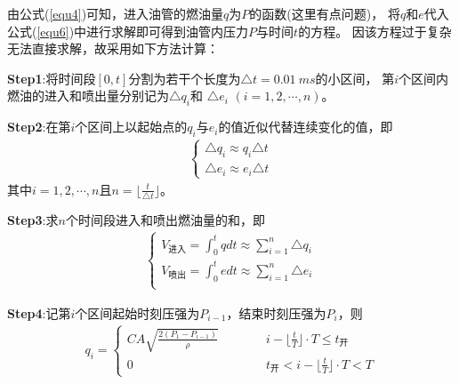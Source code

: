 \documentclass[withoutpreface,bwprint]{cumcmthesis} %
\begin{document}
    由公式(\ref{equ4})可知，进入油管的燃油量$q$为$P$的函数({\color{red}这里有点问题})，
    将$q$和$e$代入公式(\ref{equ6})中进行求解即可得到油管内压力$P$与时间$t$的方程。
    因该方程过于复杂无法直接求解，故采用如下方法计算：
    
    \textbf{Step1}:将时间段$[0,t]$分割为若干个长度为$\triangle t=0.01~ms$的小区间，
    第$i$个区间内燃油的进入和喷出量分别记为$\triangle q_i$和 $\triangle e_i$
    $(i=1,2,\cdots,n)$。

    \textbf{Step2}:在第$i$个区间上以起始点的$q_i$与$e_i$的值近似代替连续变化的值，即
    \begin{eqnarray}
        \begin{cases}
            \triangle q_i \approx q_i\triangle t\\
            \triangle e_i \approx e_i\triangle t
        \end{cases}
    \label{equ8}
    \end{eqnarray}
    其中$i=1,2,\cdots,n$且$n=\lfloor{\frac{t}{\triangle t}}\rfloor$。
    
    \textbf{Step3}:求$n$个时间段进入和喷出燃油量的和，即
    \begin{eqnarray}
        \begin{cases}
            V_{\text{进入}}=\int_0^t q dt \approx
             \sum\limits_{i=1}^n \triangle q_i \\
            V_{\text{喷出}}=\int_0^t e dt \approx
             \sum\limits_{i=1}^n \triangle e_i \\
        \end{cases}
    \label{equ9}
    \end{eqnarray}

    \textbf{Step4}:记第$i$个区间起始时刻压强为$P_{i-1}$，结束时刻压强为$P_i$，则
    \begin{eqnarray}
        q_i=
        \begin{cases}
        CA\sqrt{\frac{2(P_1-P_{i-1})}{\rho}} \quad \quad  \quad
        & i-\lfloor{\frac{t}{T}}\rfloor \cdot T \leq t_{\text{开}}\\
        0 & t_{\text{开}} < i-\lfloor{\frac{t}{T}}\rfloor \cdot T < T
        \end{cases}
    \label{equ10}
    \end{eqnarray}
\end{document}
